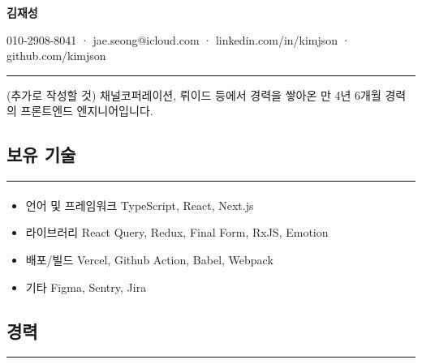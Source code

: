 \documentclass{article}
\begin{document}
\pagestyle{empty} %

\begin{center}
    \huge\textbf{김재성}
\end{center}

\begin{center}
    010-2908-8041 · jae.seong@icloud.com · linkedin.com/in/kimjson · github.com/kimjson
\end{center}

\hrule

\begin{center}
    (추가로 작성할 것) 채널코퍼레이션, 뤼이드 등에서 경력을 쌓아온 만 4년 6개월 경력의 프론트엔드 엔지니어입니다.
\end{center}

\begin{center}
    \section*{보유 기술}
\end{center}
\hrule
\paragraph{}
\begin{itemize}
    \setlength\itemsep{0.1em}
    \item 언어 및 프레임워크 \hspace{1em} TypeScript, React, Next.js
    \item 라이브러리 \hspace{4.1em} React Query, Redux, Final Form, RxJS, Emotion
    \item 배포/빌드 \hspace{4.4em} Vercel, Github Action, Babel, Webpack
    \item 기타 \hspace{6.7em} Figma, Sentry, Jira
\end{itemize}

\begin{center}
    \section*{경력}
\end{center}
\hrule
\end{document}
